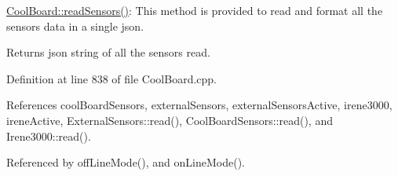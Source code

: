 \hyperlink{classCoolBoard_ad03abdce2e65f520bbf2cff0f2d083cf}{Cool\+Board\+::read\+Sensors()}\+: This method is provided to read and format all the sensors data in a single json.

\begin{DoxyReturn}{Returns}
json string of all the sensors read. 
\end{DoxyReturn}


Definition at line 838 of file Cool\+Board.\+cpp.



References cool\+Board\+Sensors, external\+Sensors, external\+Sensors\+Active, irene3000, irene\+Active, External\+Sensors\+::read(), Cool\+Board\+Sensors\+::read(), and Irene3000\+::read().



Referenced by off\+Line\+Mode(), and on\+Line\+Mode().


